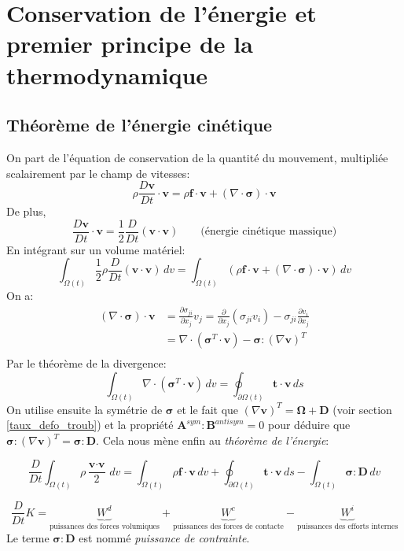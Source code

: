 \section{Conservation de l'énergie et premier principe de la thermodynamique}
\subsection{Théorème de l'énergie cinétique}
On part de l'équation de conservation de la quantité du mouvement, multipliée scalairement par le champ de vitesses:
$$\rho\frac{D\textbf{v}}{Dt}\cdot\textbf{v}=\rho\textbf{f}\cdot\textbf{v}+(\nabla\cdot\boldsymbol{\sigma})\cdot\textbf{v}$$
De plus, $$\frac{D\textbf{v}}{Dt}\cdot\textbf{v}=\frac{1}{2}\frac{D}{Dt}(\textbf{v}\cdot\textbf{v})\qquad\text{(énergie cinétique massique)}$$
En intégrant sur un volume matériel:
$$\int_{\Omega (t)}\frac{1}{2}\rho\frac{D}{Dt}(\textbf{v}\cdot\textbf{v})\,dv=\int_{\Omega (t)}(\rho\textbf{f}\cdot\textbf{v}+(\nabla\cdot\boldsymbol{\sigma})\cdot\textbf{v})\,dv$$
On a: 
\begin{align*}
(\nabla\cdot\boldsymbol{\sigma})\cdot\textbf{v}&=\frac{\partial \sigma_{ji}}{\partial x_j}v_j=\frac{\partial}{\partial x_j}(\sigma_{ji}v_i)-\sigma_{ji}\frac{\partial v_i}{\partial x_j}\\
 &=\nabla\cdot(\boldsymbol{\sigma}^T\cdot\textbf{v})-\boldsymbol{\sigma}:(\nabla\textbf{v})^T\\
\end{align*}
Par le théorème de la divergence: $$\int_{\Omega (t)}\nabla\cdot(\boldsymbol{\sigma}^T\cdot\textbf{v})\,dv=\oint_{\partial \Omega (t)}\textbf{t}\cdot\textbf{v}\,ds$$
On utilise ensuite la symétrie de $\boldsymbol{\sigma}$ et le fait que $(\nabla\textbf{v})^T=\boldsymbol{\Omega}+\textbf{D}$ (voir section \ref{taux_defo_troub}) et la propriété $\textbf{A}^{sym}:\textbf{B}^{antisym}=0$ pour déduire que $\boldsymbol{\sigma}:(\nabla\textbf{v})^T=\boldsymbol{\sigma}:\textbf{D}$. Cela nous mène enfin au \emph{théorème de l'énergie}:

$$\boxed{\frac{D}{Dt}\int_{\Omega (t)}\rho\frac{\textbf{v}\cdot\textbf{v}}{2}\,dv=\int_{\Omega (t)}\rho\textbf{f}\cdot\textbf{v}\,dv+\oint_{\partial \Omega (t)}\textbf{t}\cdot\textbf{v}\,ds-\int_{\Omega (t)}\boldsymbol{\sigma}:\textbf{D}\,dv}$$

$$\frac{D}{Dt}K=\underbrace{W^d}_{\text{puissances des forces volumiques}}+\underbrace{W^c}_{\text{puissances des forces de contacte}}-\underbrace{W^i}_{\text{puissances des efforts internes}}$$
Le terme $\boldsymbol{\sigma}:\textbf{D}$ est nommé \emph{puissance de contrainte}.
